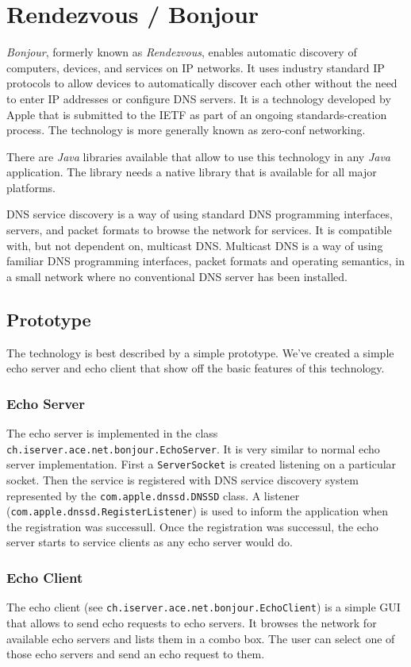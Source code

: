 \section{Rendezvous / Bonjour}
\emph{Bonjour}, formerly known as \emph{Rendezvous}, enables automatic discovery of computers, devices, and services on IP networks. It uses industry standard IP protocols to allow devices to automatically discover each other without the need to enter IP addresses or configure DNS servers. It is a technology developed by Apple that is submitted to the IETF as part of an ongoing standards-creation process. The technology is more generally known as zero-conf networking.

There are \emph{Java} libraries available that allow to use this technology in any \emph{Java} application. The library needs a native library that is available for all major platforms. 

DNS service discovery is a way of using standard DNS programming interfaces, servers, and packet formats to browse the network for services. It is compatible with, but not dependent on, multicast DNS. Multicast DNS is a way of using familiar DNS programming interfaces, packet formats and operating semantics, in a small network where no conventional DNS server has been installed.

\subsection{Prototype}
The technology is best described by a simple prototype. We've created a simple echo server and echo client that show off the basic features of this technology.

\subsubsection{Echo Server}
The echo server is implemented in the class \texttt{ch.iserver.ace.net.bonjour.EchoServer}. It is very similar to normal echo server implementation. First a \texttt{ServerSocket} is created listening on a particular socket. Then the service is registered with DNS service discovery system represented by the \texttt{com.apple.dnssd.DNSSD} class. A listener (\texttt{com.apple.dnssd.RegisterListener}) is used to inform the application when the registration was successull. Once the registration was successul, the echo server starts to service clients as any echo server would do.

\subsubsection{Echo Client}
The echo client (see \texttt{ch.iserver.ace.net.bonjour.EchoClient}) is a simple GUI that allows to send echo requests to echo servers. It browses the network for available echo servers and lists them in a combo box. The user can select one of those echo servers and send an echo request to them.

